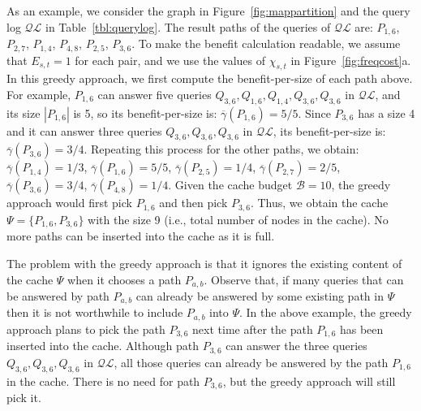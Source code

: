 \documentclass{sig-alternate}
\begin{document}
As an example, we consider the graph in Figure~\ref{fig:mappartition} and the query log $\mathcal{QL}$ in Table~\ref{tbl:querylog}.
The result paths of the queries of $\mathcal{QL}$ are: $P_{1,6}$, $P_{2,7}$, $P_{1,4}$, $P_{4,8}$, $P_{2,5}$, $P_{3,6}$.
To make the benefit calculation readable, we assume that
$E_{s,t}=1$ for each pair, and we use the values of $\chi_{s,t}$ in Figure~\ref{fig:freqcost}a.
In this greedy approach, we first compute the benefit-per-size of each path above.
For example, $P_{1,6}$ can answer five queries $Q_{3,6}, Q_{1,6}, Q_{1,4}, Q_{3,6}, Q_{3,6}$ in $\mathcal{QL}$,
and its size $|P_{1,6}|$ is 5,
so its benefit-per-size is: $\overline{\gamma}(P_{1,6})=5/5$.
Since $P_{3,6}$ has a size 4 and it can answer three queries $Q_{3,6}, Q_{3,6}, Q_{3,6}$ in $\mathcal{QL}$,
its benefit-per-size is: $\overline{\gamma}(P_{3,6})=3/4$.
Repeating this process for the other paths, we obtain:
$\overline{\gamma}(P_{1,4})=1/3$, $\overline{\gamma}(P_{1,6})=5/5$, $\overline{\gamma}(P_{2,5})=1/4$,
$\overline{\gamma}(P_{2,7})=2/5$, $\overline{\gamma}(P_{3,6})=3/4$, $\overline{\gamma}(P_{4,8})=1/4$.
%
Given the cache budget $\mathcal{B}=10$, the greedy approach would
first pick $P_{1,6}$ and then pick $P_{3,6}$.
Thus, we obtain the cache $\Psi=\{P_{1,6},P_{3,6}\}$ with the size 9 (i.e., total number of nodes in the cache).
No more paths can be inserted into the cache as it is full.




The problem with the greedy approach is that it ignores the existing
content of the cache $\Psi$ when it chooses a path $P_{a,b}$.
Observe that, if many queries that can be answered by path $P_{a,b}$
can already be answered by some existing path in $\Psi$
then it is not worthwhile to include $P_{a,b}$ into $\Psi$.
%
%
In the above example, the greedy approach plans to pick
the path $P_{3,6}$ next time after the path $P_{1,6}$ has been inserted into the cache.
Although path $P_{3,6}$ can answer the three queries $Q_{3,6}, Q_{3,6}, Q_{3,6}$ in $\mathcal{QL}$,
all those queries can already be answered by the path $P_{1,6}$ in the cache.
There is no need for path $P_{3,6}$, but the greedy approach will still pick it.


\end{document}
